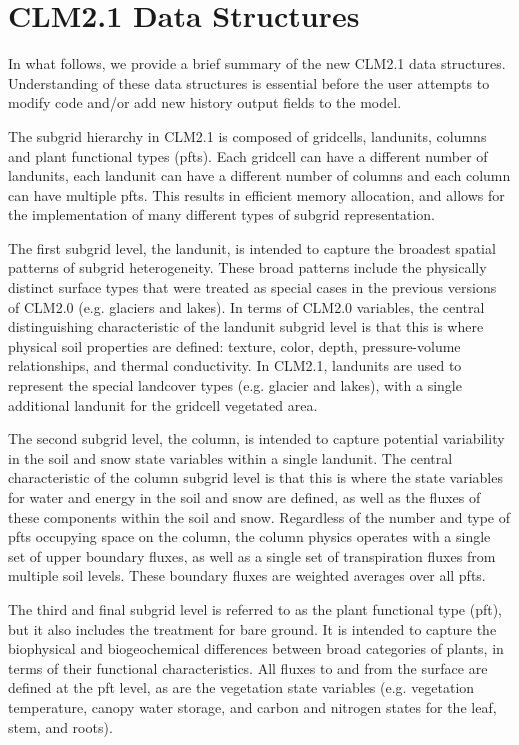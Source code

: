 \section{CLM2.1 Data Structures}
\label{sec_data_structures}

In what follows, we provide a brief summary of the new CLM2.1 data
structures. Understanding of these data structures is essential before
the user attempts to modify code and/or add new history output fields
to the model.

The subgrid hierarchy in CLM2.1 is composed of gridcells, landunits,
columns and plant functional types (pfts).  Each gridcell can have a
different number of landunits, each landunit can have a different
number of columns and each column can have multiple pfts.  This
results in efficient memory allocation, and allows for the
implementation of many different types of subgrid representation.

The first subgrid level, the landunit, is intended to capture the
broadest spatial patterns of subgrid heterogeneity.  These broad
patterns include the physically distinct surface types that were
treated as special cases in the previous versions of CLM2.0
(e.g. glaciers and lakes).  In terms of CLM2.0
variables, the central distinguishing characteristic of the landunit
subgrid level is that this is where physical soil properties are
defined: texture, color, depth, pressure-volume relationships, and
thermal conductivity.  In CLM2.1, landunits are used to represent the
special landcover types (e.g. glacier and lakes), with a single
additional landunit for the gridcell vegetated area.

The second subgrid level, the column, is intended to capture potential
variability in the soil and snow state variables within a single
landunit.  The central characteristic of the column subgrid level is
that this is where the state variables for water and energy in the
soil and snow are defined, as well as the fluxes of these components
within the soil and snow.  Regardless of the number and type of pfts
occupying space on the column, the column physics operates with a
single set of upper boundary fluxes, as well as a single set of
transpiration fluxes from multiple soil levels.  These boundary fluxes
are weighted averages over all pfts.

The third and final subgrid level is referred to as the plant
functional type (pft), but it also includes the treatment for bare
ground.  It is intended to capture the biophysical and biogeochemical
differences between broad categories of plants, in terms of their
functional characteristics.  All fluxes to and from the surface 
are defined at the pft level, as are the vegetation state variables
(e.g. vegetation temperature, canopy water storage, and carbon and
nitrogen states for the leaf, stem, and roots).

